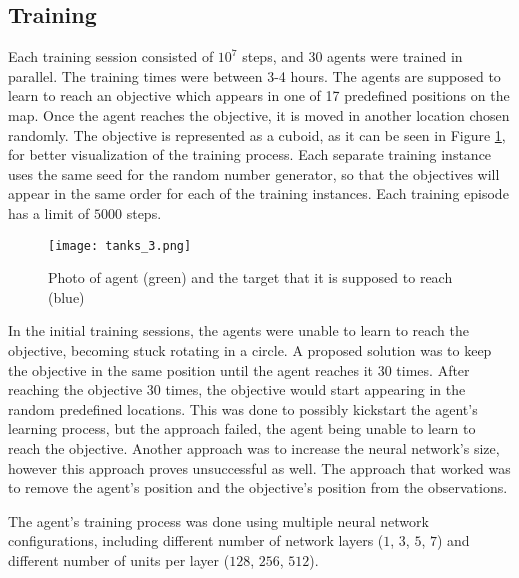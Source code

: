 \subsection{Training} \label{static_target:training}

Each training session consisted of $10^7$ steps, and 30 agents were trained in parallel. The training times were between 3-4 hours. The agents are supposed to learn to reach an objective which appears in one of 17 predefined positions on the map. Once the agent reaches the objective, it is moved in another location chosen randomly. The objective is represented as a cuboid, as it can be seen in Figure \ref{photo:tank_chasing_target}, for better visualization of the training process. Each separate training instance uses the same seed for the random number generator, so that the objectives will appear in the same order for each of the training instances. Each training episode has a limit of $5000$ steps.

\begin{figure}
    \begin{center}
        \texttt{[image: tanks\_3.png]}
        \caption{Photo of agent (green) and the target that it is supposed to reach (blue)}
        \label{photo:tank_chasing_target}
    \end{center}
\end{figure}

In the initial training sessions, the agents were unable to learn to reach the objective, becoming stuck rotating in a circle. A proposed solution was to keep the objective in the same position until the agent reaches it 30 times. After reaching the objective 30 times, the objective would start appearing in the random predefined locations. This was done to possibly kickstart the agent's learning process, but the approach failed, the agent being unable to learn to reach the objective. Another approach was to increase the neural network's size, however this approach proves unsuccessful as well. The approach that worked was to remove the agent's position and the objective's position from the observations. 

The agent's training process was done using multiple neural network configurations, including different number of network layers ($1$, $3$, $5$, $7$) and different number of units per layer ($128$, $256$, $512$).

